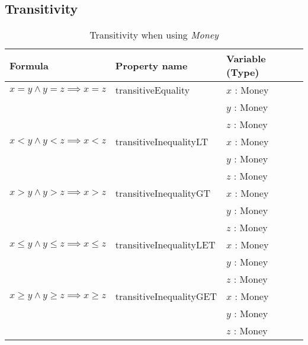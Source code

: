 \subsection*{Transitivity}
\label{ssct:properties_transitivity}
\begin{table}[!ht]
\centering
\begin{tabular}{lll}
\hline
                         \textbf{Formula}                                  & \textbf{Property name}  & \textbf{Variable (Type)} \\ \hline
\rowcolor[HTML]{EFEFEF}  $x = y \land y = z \implies x = z$                & transitiveEquality      & $x$ : Money              \\
\rowcolor[HTML]{EFEFEF}                                                    &                         & $y$ : Money              \\
\rowcolor[HTML]{EFEFEF}                                                    &                         & $z$ : Money              \\
                         $x < y \land y < z \implies x < z$                & transitiveInequalityLT  & $x$ : Money              \\
                                                                           &                         & $y$ : Money              \\
                                                                           &                         & $z$ : Money              \\
\rowcolor[HTML]{EFEFEF}  $x > y \land y > z \implies x > z$                & transitiveInequalityGT  & $x$ : Money              \\
\rowcolor[HTML]{EFEFEF}                                                    &                         & $y$ : Money              \\
\rowcolor[HTML]{EFEFEF}                                                    &                         & $z$ : Money              \\
                         $x \leq y \land y \leq z \implies x \leq z$       & transitiveInequalityLET & $x$ : Money              \\
                                                                           &                         & $y$ : Money              \\
                                                                           &                         & $z$ : Money              \\
\rowcolor[HTML]{EFEFEF}  $x \geq y \land y \geq z \implies x \geq z$       & transitiveInequalityGET & $x$ : Money              \\
\rowcolor[HTML]{EFEFEF}                                                    &                         & $y$ : Money              \\
\rowcolor[HTML]{EFEFEF}                                                    &                         & $z$ : Money              \\ \hline
\end{tabular}
\caption{Transitivity when using \textit{Money}}
\label{tbl:ch4_money_transitivity}
\end{table}
